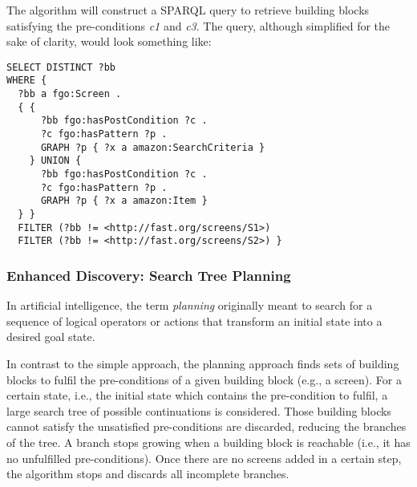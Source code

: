 The algorithm will construct a SPARQL query to retrieve building blocks satisfying the pre-conditions \emph{c1} and \emph{c3}. 
The query, although simplified for the sake of clarity, would look something like:

\begin{lstlisting}
SELECT DISTINCT ?bb 
WHERE { 
  ?bb a fgo:Screen . 
  { { 
      ?bb fgo:hasPostCondition ?c .
      ?c fgo:hasPattern ?p .
      GRAPH ?p { ?x a amazon:SearchCriteria } 
    } UNION {
      ?bb fgo:hasPostCondition ?c .
      ?c fgo:hasPattern ?p .
      GRAPH ?p { ?x a amazon:Item } 
  } }
  FILTER (?bb != <http://fast.org/screens/S1>) 
  FILTER (?bb != <http://fast.org/screens/S2>) }
\end{lstlisting}


\subsubsection{Enhanced Discovery: Search Tree Planning}
\label{sssec:planning}

In artificial intelligence, the term \emph{planning} originally meant to search for a sequence of logical operators or actions that transform an initial state into a desired goal state.%

In contrast to the simple approach, the planning approach finds sets of building blocks to fulfil the pre-conditions of a given building block (e.g., a screen). For a certain state, i.e., the initial 
state which contains the pre-condition to fulfil, a large search tree of possible continuations is considered. Those building blocks cannot satisfy the unsatisfied pre-conditions are discarded, reducing the branches of the tree. A branch stops growing when a building block is reachable (i.e., it has no unfulfilled pre-conditions). Once there are no screens 
added in a certain step, the algorithm stops and discards all incomplete branches.

